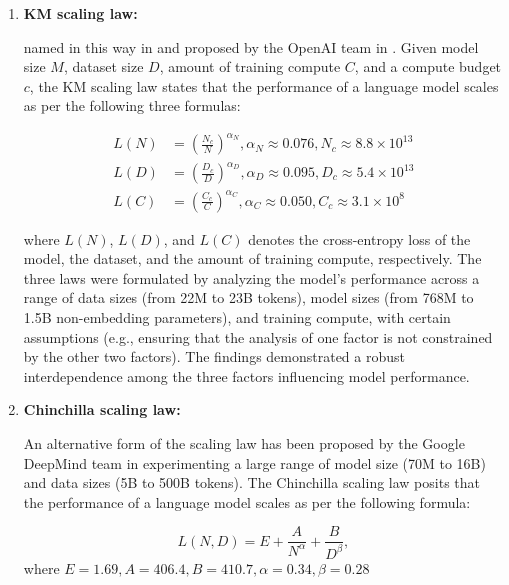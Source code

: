 \begin{enumerate}
	\item \textbf{KM scaling law:} {named in this way in \textcite{survey} and proposed by the OpenAI team in \textcite{kaplan2020scaling}. Given model size $M$, dataset size $D$, amount of training compute $C$, and a compute budget $c$, the KM scaling law states that the performance of a language model scales as per the following three formulas:

		      \begin{equation}
			      \begin{aligned}
				      L(N) & =(\frac{N_c}{N})^{\alpha_N}, \alpha_N \approx 0.076, N_c \approx 8.8 \times 10^{13} \\
				      L(D) & =(\frac{D_c}{D})^{\alpha_D}, \alpha_D \approx 0.095, D_c \approx 5.4 \times 10^{13} \\
				      L(C) & =(\frac{C_c}{C})^{\alpha_C}, \alpha_C \approx 0.050, C_c \approx 3.1 \times 10^8
			      \end{aligned}
			      \label{eq:km-scaling-law}
		      \end{equation}

		      where $L(N)$, $L(D)$, and $L(C)$ denotes the cross-entropy loss of the model, the dataset, and the amount of training compute, respectively.
		      The three laws were formulated by analyzing the model's performance across a range of data sizes (from 22M to 23B tokens), model sizes (from 768M to 1.5B non-embedding parameters), and training compute, with certain assumptions (e.g., ensuring that the analysis of one factor is not constrained by the other two factors).
		      The findings demonstrated a robust interdependence among the three factors influencing model performance.
	      }
	\item \textbf{Chinchilla scaling law:} {An alternative form of the scaling law has been proposed by the Google DeepMind team in \textcite{hoffmann2022training} experimenting a large range of model size (70M to 16B) and data sizes (5B to 500B tokens).
		      The Chinchilla scaling law posits that the performance of a language model scales as per the following formula:

		      \begin{equation}
			      L(N,D) = E + \frac{A}{N^\alpha} + \frac{B}{D^\beta},
			      \label{eq:chinchilla-scaling-law}
		      \end{equation}
		      \noindent where $E=1.69, A=406.4,B = 410.7, \alpha = 0.34, \beta = 0.28$

}
\end{enumerate}
